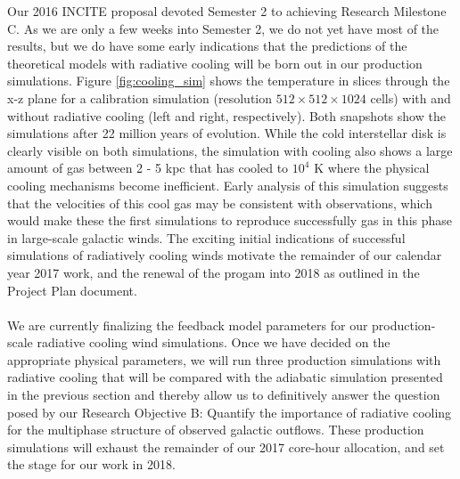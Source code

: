 \documentclass[11pt,letterpaper,english]{article}
\begin{document}
Our 2016 INCITE proposal devoted Semester 2 to achieving Research Milestone C. As we are only a few weeks into Semester 2, we do not yet have most of the results, but we do have some early indications that the predictions of the theoretical models with radiative cooling will be born out in our production simulations. Figure \ref{fig:cooling_sim} shows the temperature in slices through the x-z plane for a calibration simulation (resolution $512\times512\times1024$ cells) with and without radiative cooling (left and right, respectively). Both snapshots show the simulations after 22 million years of evolution. While the cold interstellar disk is clearly visible on both simulations, the simulation with cooling also shows a large amount of gas between 2 - 5 kpc that has cooled to $10^4$ K where the physical cooling mechanisms
become inefficient. Early analysis of this simulation suggests that the velocities of this cool gas may be consistent with observations, which would make these the first simulations to reproduce successfully gas in this phase in large-scale galactic winds. The exciting initial indications of successful simulations of
radiatively cooling winds motivate the remainder of our calendar year 2017 work, and the renewal of the
progam into 2018 as outlined in the Project Plan document.
~\\~\\
We are currently finalizing the feedback model parameters for our production-scale radiative cooling wind simulations. Once we have decided on the appropriate physical parameters, 
we will run three production simulations with radiative cooling that will be compared with the adiabatic simulation presented in the previous section and thereby allow us to definitively answer the question posed by our Research Objective B: Quantify the importance of radiative cooling for the multiphase structure of observed galactic outflows. These production simulations will exhaust the remainder of our 2017 core-hour
allocation, and set the stage for our work in 2018.
\end{document}
